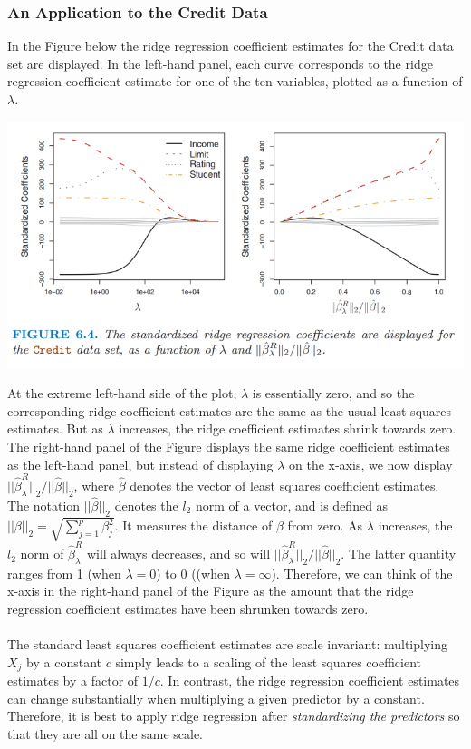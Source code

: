 \subsubsection{An Application to the Credit Data}
In the Figure below the ridge regression coefficient estimates for the Credit data set are displayed. In the left-hand panel, each curve corresponds to the ridge regression coefficient estimate for one of the ten variables, plotted as a function of $\lambda$.
\begin{center}
    \includegraphics[scale=0.7]{images/ridge-reg.png}
\end{center}
At the extreme left-hand side of the plot, $\lambda$ is essentially zero, and so the corresponding ridge coefficient estimates are the same as the usual least squares estimates. But as $\lambda$ increases, the ridge coefficient estimates shrink towards zero. The right-hand panel of the Figure  displays the same ridge coefficient estimates as the left-hand panel, but instead of displaying $\lambda$ on the x-axis, we now display $||\hat{\beta}_\lambda^R||_2 / ||\hat{\beta}||_2$, where $\hat{\beta}$ denotes the vector of least squares coefficient estimates. The notation $||\hat{\beta}||_2$ denotes the $l_2$ norm of a vector, and is defined as $||\beta||_2 = \sqrt{\sum_{j=1}^p \beta_j^2}$. It measures the distance of $\beta$ from zero. As $\lambda$ increases, the $l_2$ norm of $\hat{\beta}_\lambda^R$ will always decreases, and so will $||\hat{\beta}_\lambda^R||_2 / ||\hat{\beta}||_2$.  The latter quantity ranges from 1 (when $\lambda = 0$) to 0 ((when $\lambda = \infty$). Therefore, we can think of the x-axis in the right-hand panel of the Figure as the amount that the ridge regression coefficient estimates have been shrunken towards zero.\\\\
The standard least squares coefficient estimates are scale invariant: multiplying $X_j$ by a constant $c$ simply leads to a scaling of the least squares coefficient estimates by a factor of $1/c$. In contrast, the ridge regression coefficient estimates can change substantially when multiplying a given predictor by a constant. Therefore, it is best to apply ridge regression after \textit{standardizing the predictors} so that they are all on the same scale.

